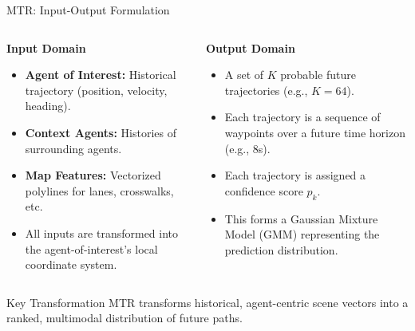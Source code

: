 \documentclass[10pt,aspectratio=169]{beamer}
\begin{document}
\begin{frame}{MTR: Input-Output Formulation}
    \begin{columns}[T]
        \begin{column}{0.5\textwidth}
            \textbf{Input Domain}
            \begin{itemize}
                \item \textbf{Agent of Interest:} Historical trajectory (position, velocity, heading).
                \item \textbf{Context Agents:} Histories of surrounding agents.
                \item \textbf{Map Features:} Vectorized polylines for lanes, crosswalks, etc.
                \item All inputs are transformed into the agent-of-interest's local coordinate system.
            \end{itemize}
        \end{column}
        \begin{column}{0.5\textwidth}
            \textbf{Output Domain}
            \begin{itemize}
                \item A set of $K$ probable future trajectories (e.g., $K=64$).
                \item Each trajectory is a sequence of waypoints over a future time horizon (e.g., 8s).
                \item Each trajectory is assigned a confidence score $p_k$.
                \item This forms a Gaussian Mixture Model (GMM) representing the prediction distribution.
            \end{itemize}
        \end{column}
    \end{columns}
    \vfill
    \begin{block}{Key Transformation}
        MTR transforms historical, agent-centric scene vectors into a ranked, multimodal distribution of future paths.
    \end{block}
\end{frame}
\end{document}
